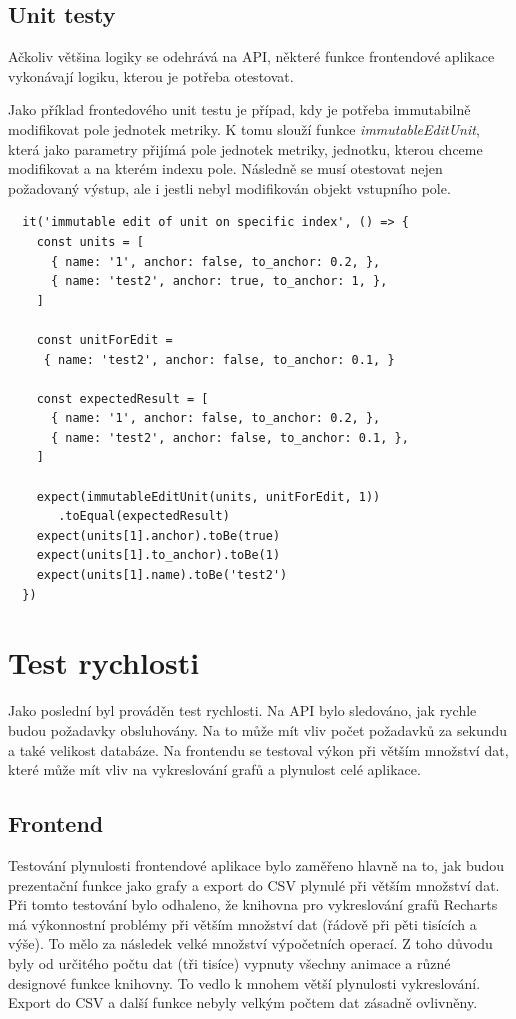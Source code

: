 \documentclass[thesis=M,czech]{FITthesis}[2018/10/20]
\begin{document}
\subsection{Unit testy}
Ačkoliv většina logiky se odehrává na API, některé funkce frontendové aplikace vykonávají logiku, kterou je potřeba otestovat.


Jako příklad frontedového unit testu je případ, kdy je potřeba immutabilně modifikovat pole jednotek metriky. K tomu slouží funkce \textit{immutableEditUnit}, která jako parametry přijímá pole jednotek metriky, jednotku, kterou chceme modifikovat a na kterém indexu pole. Následně se musí otestovat nejen požadovaný výstup, ale i jestli nebyl modifikován objekt vstupního pole.

\begin{lstlisting}
  it('immutable edit of unit on specific index', () => {
    const units = [          
      { name: '1', anchor: false, to_anchor: 0.2, },                     
      { name: 'test2', anchor: true, to_anchor: 1, },
    ]
       
    const unitForEdit = 
     { name: 'test2', anchor: false, to_anchor: 0.1, }
       
    const expectedResult = [ 
      { name: '1', anchor: false, to_anchor: 0.2, },                     
      { name: 'test2', anchor: false, to_anchor: 0.1, },
    ]                        
  
    expect(immutableEditUnit(units, unitForEdit, 1))
       .toEqual(expectedResult)
    expect(units[1].anchor).toBe(true)
    expect(units[1].to_anchor).toBe(1)
    expect(units[1].name).toBe('test2')
  })

\end{lstlisting}
\newpage
\section{Test rychlosti}
Jako poslední byl prováděn test rychlosti. Na API bylo sledováno, jak rychle budou požadavky obsluhovány. Na to může mít vliv počet požadavků za sekundu a také velikost databáze. Na frontendu se testoval výkon při větším množství dat, které může mít vliv na vykreslování grafů a plynulost celé aplikace.

\subsection{Frontend}
Testování plynulosti frontendové aplikace bylo zaměřeno hlavně na to, jak budou prezentační funkce jako grafy a export do CSV plynulé při větším množství dat. Při tomto testování bylo odhaleno, že knihovna pro vykreslování grafů Recharts má výkonnostní problémy při větším množství dat (řádově při pěti tisících a výše). To mělo za následek velké množství výpočetních operací. Z toho důvodu byly od určitého počtu dat (tři tisíce) vypnuty všechny animace a různé designové funkce knihovny. To vedlo k mnohem větší plynulosti vykreslování. Export do CSV a další funkce nebyly velkým počtem dat zásadně ovlivněny.
\end{document}
